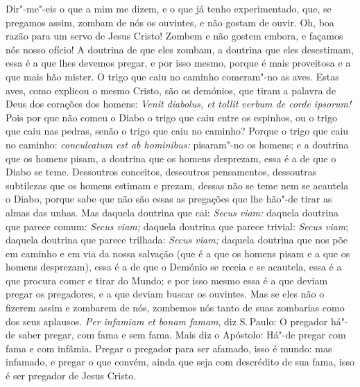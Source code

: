 Dir"-me"-eis o que a mim me dizem, e o que já tenho experimentado, que,
se pregamos assim, zombam de nós os ouvintes, e não gostam de ouvir. Oh,
boa razão para um servo de Jesus Cristo! Zombem e não gostem embora, e
façamos nós nosso ofício! A doutrina de que eles zombam, a doutrina que
eles desestimam, essa é a que lhes devemos pregar, e por isso mesmo,
porque é mais proveitosa e a que mais hão mister. O trigo que caiu no
caminho comeram"-no as aves. Estas aves, como explicou o mesmo Cristo,
são os demónios, que tiram a palavra de Deus dos corações dos homens:
\emph{Venit diabolus, et tollit verbum de corde ipsorum!} Pois por que
não comeu o Diabo o trigo que caiu entre os espinhos, ou o trigo que
caiu nas pedras, senão o trigo que caiu no caminho? Porque o trigo
que caiu no caminho: \emph{conculcatum est ab hominibus:} pisaram"-no
os homens; e a doutrina que os homens pisam, a doutrina que os homens
desprezam, essa é a de que o Diabo se teme. Dessoutros conceitos,
dessoutros pensamentos, dessoutras subtilezas que os homens estimam e
prezam, dessas não se teme nem se acautela o Diabo, porque sabe que não
são essas as pregações que lhe hão"-de tirar as almas das unhas. Mas
daquela doutrina que cai: \emph{Secus viam:} daquela doutrina que
parece comum: \emph{Secus viam;} daquela doutrina que parece trivial:
\emph{Secus viam}; daquela doutrina que parece trilhada: \emph{Secus
viam;} daquela doutrina que nos põe em caminho e em via da nossa
salvação (que é a que os homens pisam e a que os homens desprezam), essa
é a de que o Demónio se receia e se acautela, essa é a que procura comer
e tirar do Mundo; e por isso mesmo essa é a que deviam pregar os
pregadores, e a que deviam buscar os ouvintes. Mas se eles não o fizerem
assim e zombarem de nós, zombemos nós tanto de suas zombarias como dos
seus aplausos. \emph{Per infamiam et bonam famam}, diz S.\,Paulo: O
pregador há"-de saber pregar, com fama e sem fama. Mais diz o
Apóstolo: Há"-de pregar com fama e com infâmia. Pregar o pregador para
ser afamado, isso é mundo: mas
infamado, e pregar o que convém, ainda que seja com descrédito de sua
fama, isso é ser pregador de Jesus Cristo.

